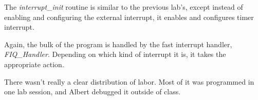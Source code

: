 \documentclass[letterpaper,10pt]{article}
\begin{document}
    \begin{minipage}{\linewidth}
        
        \label{flo:main}
    \end{minipage}

    The \textit{interrupt\_init} routine is similar to the previous lab's,
    except instead of enabling and configuring the external interrupt, it
    enables and configures timer interrupt.

    \begin{minipage}{\linewidth}
        
        \label{flo:interrupt_init}
    \end{minipage}

    Again, the bulk of the program is handled by the fast interrupt handler,
    \textit{FIQ\_Handler}. Depending on which kind of interrupt it is, it takes
    the appropriate action.

    

    \begin{minipage}{\linewidth}
        
        \label{flo:fiq_handler}
    \end{minipage}

    There wasn't really a clear distribution of labor. Most of it was
    programmed in one lab session, and Albert debugged it outside of class.
\end{document}
